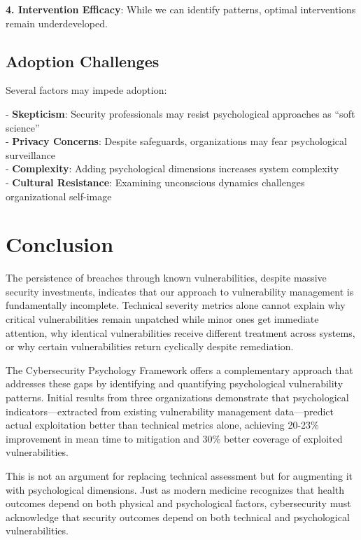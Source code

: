 \documentclass[11pt,a4paper]{article}
\begin{document}
\textbf{4. Intervention Efficacy}: While we can identify patterns, optimal interventions remain underdeveloped.

\subsection{Adoption Challenges}

Several factors may impede adoption:

- \textbf{Skepticism}: Security professionals may resist psychological approaches as ``soft science''\\
- \textbf{Privacy Concerns}: Despite safeguards, organizations may fear psychological surveillance\\
- \textbf{Complexity}: Adding psychological dimensions increases system complexity\\
- \textbf{Cultural Resistance}: Examining unconscious dynamics challenges organizational self-image\\

\section{Conclusion}

The persistence of breaches through known vulnerabilities, despite massive security investments, indicates that our approach to vulnerability management is fundamentally incomplete. Technical severity metrics alone cannot explain why critical vulnerabilities remain unpatched while minor ones get immediate attention, why identical vulnerabilities receive different treatment across systems, or why certain vulnerabilities return cyclically despite remediation.

The Cybersecurity Psychology Framework offers a complementary approach that addresses these gaps by identifying and quantifying psychological vulnerability patterns. Initial results from three organizations demonstrate that psychological indicators—extracted from existing vulnerability management data—predict actual exploitation better than technical metrics alone, achieving 20-23\% improvement in mean time to mitigation and 30\% better coverage of exploited vulnerabilities.

This is not an argument for replacing technical assessment but for augmenting it with psychological dimensions. Just as modern medicine recognizes that health outcomes depend on both physical and psychological factors, cybersecurity must acknowledge that security outcomes depend on both technical and psychological vulnerabilities.
\end{document}
